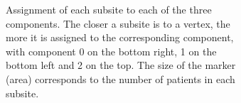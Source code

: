 \documentclass[
  sn-mathphys-num,
]{sn-jnl}
\begin{document}
\begin{figure}

\begin{minipage}{0.71\linewidth}

\begin{figure}[H]


\caption{\label{fig-3_simplex}Assignment of each subsite to each of the
three components. The closer a subsite is to a vertex, the more it is
assigned to the corresponding component, with component 0 on the bottom
right, 1 on the bottom left and 2 on the top. The size of the marker
(area) corresponds to the number of patients in each subsite.}

\end{figure}%

\end{minipage}%
%
\begin{minipage}{0.29\linewidth}

\begin{figure}[H]

\centering{

}
\end{figure}
\end{minipage}
\end{figure}
\end{document}
